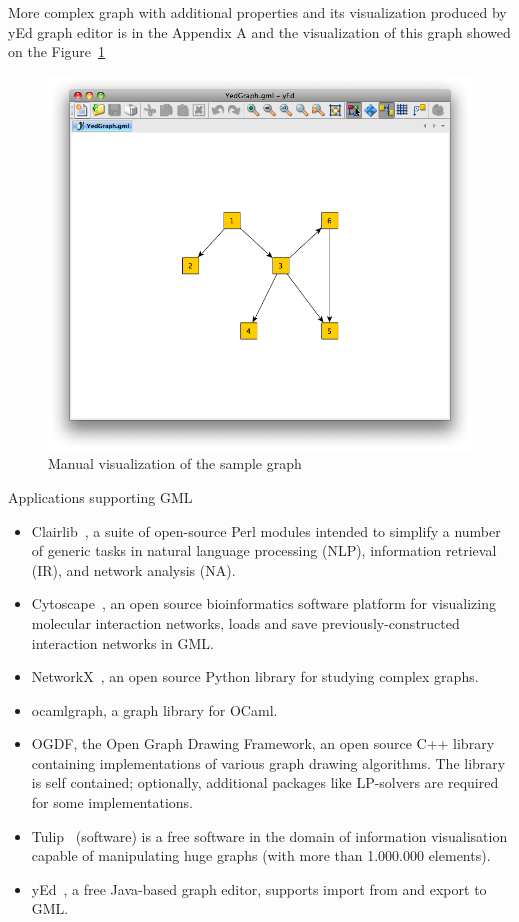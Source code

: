 \documentclass[a4paper,oneside]{article}
\begin{document}
More complex graph with additional properties and its visualization produced by yEd graph editor is in the Appendix A and the visualization of this graph showed on the Figure~\ref{yed_graph_vis}

\begin{center}
\begin{figure}
	\includegraphics[scale=0.5]{YedGraph.png}
	\caption{Manual visualization of the sample graph}
	\label{yed_graph_vis}
\end{figure}
\end{center}

Applications supporting GML~\cite{GML_wiki}

\begin{itemize}
\item Clairlib~\cite{clairlib}, a suite of open-source Perl modules intended to simplify a number of generic tasks in natural language processing (NLP), information retrieval (IR), and network analysis (NA).
\item Cytoscape~\cite{Cytoscape}, an open source bioinformatics software platform for visualizing molecular interaction networks, loads and save previously-constructed interaction networks in GML.
\item NetworkX~\cite{NetworkX}, an open source Python library for studying complex graphs.
\item ocamlgraph\cite{ocamlgraph}, a graph library for OCaml.
\item OGDF\cite{OGDF}, the Open Graph Drawing Framework, an open source C++ library containing implementations of various graph drawing algorithms. The library is self contained; optionally, additional packages like LP-solvers are required for some implementations.
\item Tulip~\cite{Tulip} (software) is a free software in the domain of information visualisation capable of manipulating huge graphs (with more than 1.000.000 elements).
\item yEd~\cite{yEd}, a free Java-based graph editor, supports import from and export to GML.
\end{itemize}
\end{document}
